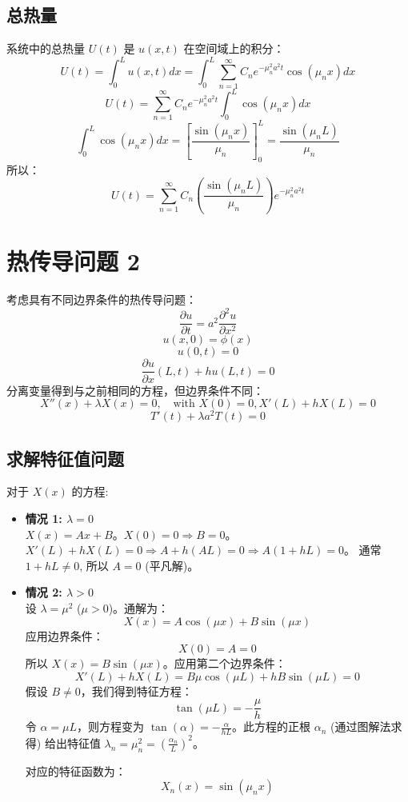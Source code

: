 \documentclass{article}
\begin{document}
	\subsection*{总热量}
	系统中的总热量 $U(t)$ 是 $u(x,t)$ 在空间域上的积分：
	$$ U(t) = \int_0^L u(x,t) dx = \int_0^L \sum_{n=1}^{\infty} C_n e^{-\mu_n^2 a^2 t} \cos(\mu_n x) dx $$
	$$ U(t) = \sum_{n=1}^{\infty} C_n e^{-\mu_n^2 a^2 t} \int_0^L \cos(\mu_n x) dx $$
	$$ \int_0^L \cos(\mu_n x) dx = \left[ \frac{\sin(\mu_n x)}{\mu_n} \right]_0^L = \frac{\sin(\mu_n L)}{\mu_n} $$
	所以：
	$$ U(t) = \sum_{n=1}^{\infty} C_n \left( \frac{\sin(\mu_n L)}{\mu_n} \right) e^{-\mu_n^2 a^2 t} $$
	
	\newpage
	
	\section*{热传导问题 2}
	考虑具有不同边界条件的热传导问题：
	$$ \frac{\partial u}{\partial t} = a^2 \frac{\partial^2 u}{\partial x^2} $$
	$$ u(x,0) = \phi(x) $$
	$$ u(0,t) = 0 $$
	$$ \frac{\partial u}{\partial x}(L,t) + h u(L,t) = 0 $$
	分离变量得到与之前相同的方程，但边界条件不同：
	$$ X''(x) + \lambda X(x) = 0, \quad \text{with } X(0)=0, X'(L)+hX(L)=0 $$
	$$ T'(t) + \lambda a^2 T(t) = 0 $$
	
	\subsection*{求解特征值问题}
	对于 $X(x)$ 的方程:
	\begin{itemize}
		\item \textbf{情况 1: $\lambda = 0$} \\
		$X(x) = Ax+B$。$X(0)=0 \Rightarrow B=0$。$X'(L)+hX(L)=0 \Rightarrow A+h(AL)=0 \Rightarrow A(1+hL)=0$。
		通常 $1+hL \neq 0$, 所以 $A=0$ (平凡解)。
		
		\item \textbf{情况 2: $\lambda > 0$} \\
		设 $\lambda = \mu^2$ ($\mu>0$)。通解为：
		$$ X(x) = A\cos(\mu x) + B\sin(\mu x) $$
		应用边界条件：
		$$ X(0) = A = 0 $$
		所以 $X(x) = B\sin(\mu x)$。应用第二个边界条件：
		$$ X'(L)+hX(L) = B\mu\cos(\mu L) + hB\sin(\mu L) = 0 $$
		假设 $B \neq 0$，我们得到特征方程：
		$$ \tan(\mu L) = -\frac{\mu}{h} $$
		令 $\alpha = \mu L$，则方程变为 $\tan(\alpha) = -\frac{\alpha}{hL}$。此方程的正根 $\alpha_n$ (通过图解法求得) 给出特征值 $\lambda_n = \mu_n^2 = (\frac{\alpha_n}{L})^2$。
		
		对应的特征函数为：
		$$ X_n(x) = \sin(\mu_n x) $$
	\end{itemize}
	
\end{document}
